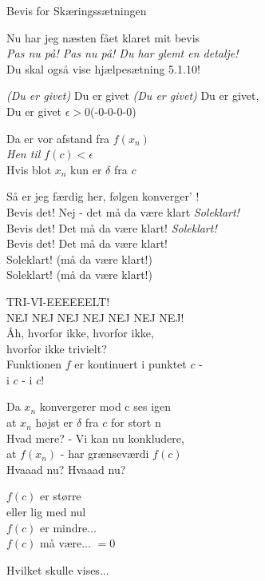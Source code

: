 \begin{song}{Bevis for Skæringssætningen}
  \begin{SBSection*}
    Nu har jeg næsten fået klaret mit bevis\\
    \emph{Pas nu på! Pas nu på! Du har glemt en detalje!}\\
    Du skal også vise hjælpesætning 5.1.10!
  \end{SBSection*}

  \begin{SBSection*}
    \emph{(Du er givet)} Du er givet \emph{(Du er givet)} Du er givet,\\
    Du er givet $\epsilon> 0$(-0-0-0-0)
  \end{SBSection*}

  \begin{SBSection*}
    Da er vor afstand fra $f(x_n)$\\
    \emph{Hen til $f(c) < \epsilon$}\\
    Hvis blot $x_n$ kun er $\delta$ fra $c$
  \end{SBSection*}

  \begin{SBSection*}
    Så er jeg færdig her, følgen konverger' !\\
    Bevis det! Nej - det må da være klart \emph{Soleklart!}\\
    Bevis det! Det må da være klart! \emph{Soleklart!}\\
    Bevis det! Det må da være klart!\\
    Soleklart! (må da være klart!)\\
    Soleklart! (må da være klart!)
  \end{SBSection*}

  \begin{SBSection*}
    TRI-VI-EEEEEELT!\\
    NEJ NEJ NEJ NEJ NEJ NEJ NEJ!\\
    Åh, hvorfor ikke, hvorfor ikke,\\
    hvorfor ikke trivielt?\\
    Funktionen $f$ er kontinuert i punktet $c$ -\\
    i $c$ - i $c$!
  \end{SBSection*}

  \begin{SBSection*}
    Da $x_n$ konvergerer mod c ses igen\\
    at $x_n$ højst er $\delta$ fra $c$ for stort n\\
    Hvad mere? - Vi kan nu konkludere,\\
    at $f(x_n)$ - har grænseværdi $f(c)$\\
    \medskip
    Hvaaad nu? Hvaaad nu?
  \end{SBSection*}

  \begin{SBSection*}
    $f(c)$ er større\\
    eller lig med nul\\
    $f(c)$ er mindre...\\
    $f(c)$ må være... $= 0$
  \end{SBSection*}

  \begin{SBSection*}
    Hvilket skulle vises...
  \end{SBSection*}
\end{song}